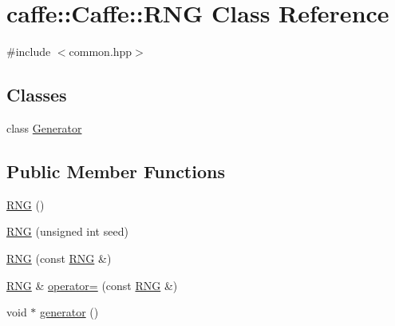 \hypertarget{classcaffe_1_1_caffe_1_1_r_n_g}{\section{caffe\+:\+:Caffe\+:\+:R\+N\+G Class Reference}
\label{classcaffe_1_1_caffe_1_1_r_n_g}
}


{\ttfamily \#include $<$common.\+hpp$>$}

\subsection*{Classes}
\begin{DoxyCompactItemize}
\item 
class \hyperlink{classcaffe_1_1_caffe_1_1_r_n_g_1_1_generator}{Generator}
\end{DoxyCompactItemize}
\subsection*{Public Member Functions}
\begin{DoxyCompactItemize}
\item 
\hyperlink{classcaffe_1_1_caffe_1_1_r_n_g_af37400873f523efc2cb655148e803aab}{R\+N\+G} ()
\item 
\hyperlink{classcaffe_1_1_caffe_1_1_r_n_g_a0b676deb529cd8b60b58c527c53a2130}{R\+N\+G} (unsigned int seed)
\item 
\hyperlink{classcaffe_1_1_caffe_1_1_r_n_g_a1c16756c9b842bf803d1203e6d397b98}{R\+N\+G} (const \hyperlink{classcaffe_1_1_caffe_1_1_r_n_g}{R\+N\+G} \&)
\item 
\hyperlink{classcaffe_1_1_caffe_1_1_r_n_g}{R\+N\+G} \& \hyperlink{classcaffe_1_1_caffe_1_1_r_n_g_a8369fd231a12f34d39c85cbcce69b847}{operator=} (const \hyperlink{classcaffe_1_1_caffe_1_1_r_n_g}{R\+N\+G} \&)
\item 
void $\ast$ \hyperlink{classcaffe_1_1_caffe_1_1_r_n_g_a4cbd9a29a1fe7220d16e8751cbb55560}{generator} ()
\end{DoxyCompactItemize}


